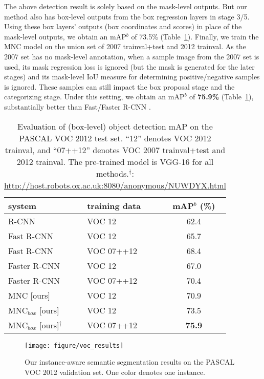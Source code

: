 \documentclass[10pt,twocolumn,letterpaper]{article}
\begin{document}
The above detection result is solely based on the mask-level outputs. But our method also has box-level outputs from the box regression layers in stage 3/5. Using these box layers' outputs (box coordinates and scores) in place of the mask-level outputs, we obtain an mAP$^b$ of 73.5\% (Table~\ref{tab:det_result}).
Finally, we train the MNC model on the union set of 2007 trainval+test and 2012 trainval. As the 2007 set has no mask-level annotation, when a sample image from the 2007 set is used, its mask regression loss is ignored (but the mask is generated for the later stages) and its mask-level IoU measure for determining positive/negative samples is ignored. These samples can still impact the box proposal stage and the categorizing stage. Under this setting, we obtain an mAP$^b$ of \textbf{75.9\%} (Table~\ref{tab:det_result}), substantially better than Fast/Faster R-CNN \cite{Girshick2015,Ren2015}.

\setlength{\tabcolsep}{8pt}
\renewcommand{\arraystretch}{1.05}
\begin{table}[t]
\begin{center}
\small
\begin{tabular}{l|l|c}
system & training data & mAP$^{b}$ (\%) \\
\hline
R-CNN \cite{Girshick2014} & VOC 12 & 62.4 \\
Fast R-CNN \cite{Girshick2015} & VOC 12 &  65.7 \\
Fast R-CNN \cite{Girshick2015} & VOC 07++12 &  68.4 \\
Faster R-CNN \cite{Ren2015} & VOC 12 & 67.0 \\
Faster R-CNN \cite{Ren2015} & VOC 07++12 & 70.4 \\
\hline
MNC [ours] & VOC 12 & 70.9 \\
MNC$_{box}$ [ours] & VOC 12 & 73.5 \\
MNC$_{box}$ [ours]$^\dag$ & VOC 07++12 & \textbf{75.9} \\
\end{tabular}
\end{center}
\vspace{-.5em}
\caption{Evaluation of (box-level) object detection mAP on the PASCAL VOC 2012 test set. ``12'' denotes VOC 2012 trainval, and ``07++12'' denotes VOC 2007 trainval+test and 2012 trainval. The pre-trained model is VGG-16 for all methods.$^\dag$: \url{http://host.robots.ox.ac.uk:8080/anonymous/NUWDYX.html}}
\label{tab:det_result}
\end{table}


\begin{figure*}
\begin{center}
\texttt{[image: figure/voc\_results]}
\end{center}
\vspace{-1em}
\caption{Our instance-aware semantic segmentation results on the PASCAL VOC 2012 validation set. One color denotes one instance.}
\label{fig:voc_results}
\vspace{-1em}
\end{figure*}
\end{document}
